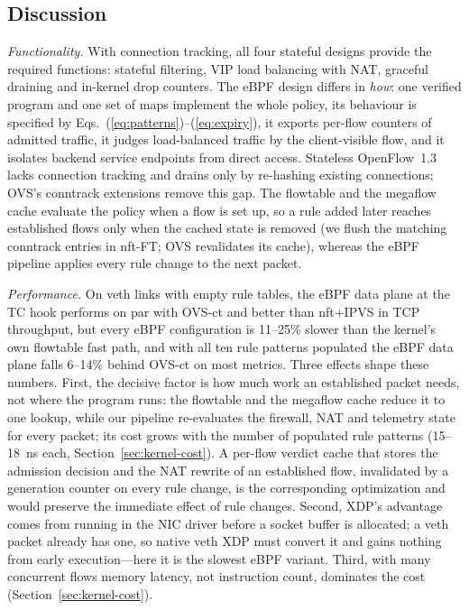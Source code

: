 \documentclass[conference]{IEEEtran}
\begin{document}
\subsection{Discussion}
\textit{Functionality.} With connection tracking, all four stateful designs
provide the required functions: stateful filtering, VIP load balancing with
NAT, graceful draining and in-kernel drop counters. The eBPF design differs in
\emph{how}: one verified program and one set of maps implement the whole
policy, its behaviour is specified by
Eqs.~(\ref{eq:patterns})--(\ref{eq:expiry}), it exports per-flow counters of
admitted traffic, it judges load-balanced traffic by the client-visible flow,
and it isolates backend service endpoints from direct access. Stateless
OpenFlow~1.3 lacks connection tracking and drains only by re-hashing existing
connections; OVS's conntrack extensions remove this gap. The flowtable and
the megaflow cache evaluate the policy when a flow is set up, so a rule added
later reaches established flows only when the cached state is removed (we
flush the matching conntrack entries in nft-FT; OVS revalidates its cache),
whereas the eBPF pipeline applies every rule change to the next packet.

\textit{Performance.} On veth links with empty rule tables, the eBPF data
plane at the TC hook performs on par with OVS-ct and better than nft+IPVS in
TCP throughput, but every eBPF configuration is 11--25\% slower than the
kernel's own flowtable fast path, and with all ten rule patterns populated the
eBPF data plane falls 6--14\% behind OVS-ct on most metrics. Three effects shape these
numbers. First, the decisive factor is how much work an established packet
needs, not where the program runs: the flowtable and the megaflow cache
reduce it to one lookup, while our pipeline re-evaluates the firewall, NAT
and telemetry state for every packet; its cost grows with the number of
populated rule patterns (15--18~ns each, Section~\ref{sec:kernel-cost}). A
per-flow verdict cache that stores the admission decision and the NAT
rewrite of an established flow, invalidated by a generation counter on every
rule change, is the corresponding optimization and would preserve the
immediate effect of rule changes. Second, XDP's advantage comes from running
in the NIC driver before a socket buffer is allocated; a veth packet already
has one, so native veth XDP must convert it and gains nothing from early
execution---here it is the slowest eBPF variant. Third, with many concurrent
flows memory latency, not instruction count, dominates the cost
(Section~\ref{sec:kernel-cost}).
\end{document}
